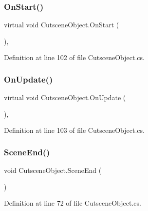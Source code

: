 \subsubsection{\texorpdfstring{On\+Start()}{OnStart()}}
{\footnotesize\ttfamily virtual void Cutscene\+Object.\+On\+Start (\begin{DoxyParamCaption}{ }\end{DoxyParamCaption})\hspace{0.3cm}{\ttfamily [protected]}, {\ttfamily [virtual]}}



Definition at line 102 of file Cutscene\+Object.\+cs.

\mbox{\label{class_cutscene_object_adf319191840e097209184bb0adb69059}} 
\subsubsection{\texorpdfstring{On\+Update()}{OnUpdate()}}
{\footnotesize\ttfamily virtual void Cutscene\+Object.\+On\+Update (\begin{DoxyParamCaption}{ }\end{DoxyParamCaption})\hspace{0.3cm}{\ttfamily [protected]}, {\ttfamily [virtual]}}



Definition at line 103 of file Cutscene\+Object.\+cs.

\mbox{\label{class_cutscene_object_ad3f71206703f9912e26b3c007259d4fb}} 
\subsubsection{\texorpdfstring{Scene\+End()}{SceneEnd()}}
{\footnotesize\ttfamily void Cutscene\+Object.\+Scene\+End (\begin{DoxyParamCaption}{ }\end{DoxyParamCaption})}



Definition at line 72 of file Cutscene\+Object.\+cs.

\mbox{\label{class_cutscene_object_a041b232f8146038cc625120e1cab138d}} 

